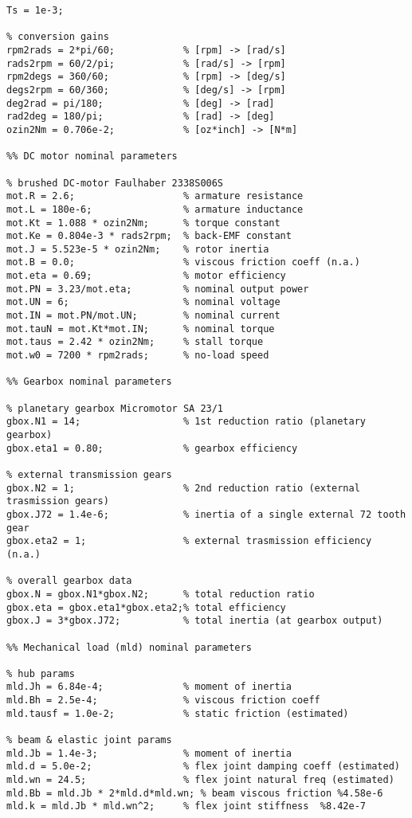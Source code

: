 \begin{lstlisting}[caption=\texttt{global\_parameters.m.},label=lst:global-params]
%% General parameters and conversion gains
Ts = 1e-3;

% conversion gains
rpm2rads = 2*pi/60;            % [rpm] -> [rad/s]
rads2rpm = 60/2/pi;            % [rad/s] -> [rpm]
rpm2degs = 360/60;             % [rpm] -> [deg/s]
degs2rpm = 60/360;             % [deg/s] -> [rpm]
deg2rad = pi/180;              % [deg] -> [rad]
rad2deg = 180/pi;              % [rad] -> [deg]
ozin2Nm = 0.706e-2;            % [oz*inch] -> [N*m]

%% DC motor nominal parameters

% brushed DC-motor Faulhaber 2338S006S
mot.R = 2.6;                   % armature resistance
mot.L = 180e-6;                % armature inductance
mot.Kt = 1.088 * ozin2Nm;      % torque constant
mot.Ke = 0.804e-3 * rads2rpm;  % back-EMF constant
mot.J = 5.523e-5 * ozin2Nm;    % rotor inertia
mot.B = 0.0;                   % viscous friction coeff (n.a.)
mot.eta = 0.69;                % motor efficiency
mot.PN = 3.23/mot.eta;         % nominal output power
mot.UN = 6;                    % nominal voltage
mot.IN = mot.PN/mot.UN;        % nominal current
mot.tauN = mot.Kt*mot.IN;      % nominal torque
mot.taus = 2.42 * ozin2Nm;     % stall torque
mot.w0 = 7200 * rpm2rads;      % no-load speed

%% Gearbox nominal parameters

% planetary gearbox Micromotor SA 23/1
gbox.N1 = 14;                  % 1st reduction ratio (planetary gearbox)
gbox.eta1 = 0.80;              % gearbox efficiency

% external transmission gears
gbox.N2 = 1;                   % 2nd reduction ratio (external trasmission gears)
gbox.J72 = 1.4e-6;             % inertia of a single external 72 tooth gear
gbox.eta2 = 1;                 % external trasmission efficiency (n.a.)

% overall gearbox data
gbox.N = gbox.N1*gbox.N2;      % total reduction ratio
gbox.eta = gbox.eta1*gbox.eta2;% total efficiency
gbox.J = 3*gbox.J72;           % total inertia (at gearbox output)

%% Mechanical load (mld) nominal parameters

% hub params
mld.Jh = 6.84e-4;              % moment of inertia
mld.Bh = 2.5e-4;               % viscous friction coeff
mld.tausf = 1.0e-2;            % static friction (estimated)

% beam & elastic joint params
mld.Jb = 1.4e-3;               % moment of inertia
mld.d = 5.0e-2;                % flex joint damping coeff (estimated)
mld.wn = 24.5;                 % flex joint natural freq (estimated)
mld.Bb = mld.Jb * 2*mld.d*mld.wn; % beam viscous friction %4.58e-6
mld.k = mld.Jb * mld.wn^2;     % flex joint stiffness  %8.42e-7


\end{lstlisting}
